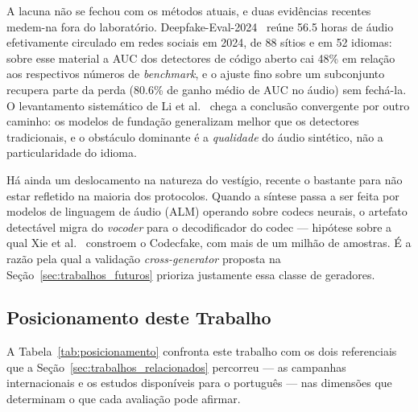 \documentclass[12pt,a4paper]{article}
\begin{document}
A lacuna não se fechou com os métodos atuais, e duas evidências recentes
medem-na fora do laboratório. Deepfake-Eval-2024~\cite{chandra2025deepfakeeval}
reúne \num{56,5} horas de áudio efetivamente circulado em redes sociais em
\num{2024}, de \num{88} sítios e em \num{52} idiomas: sobre esse material a
AUC dos detectores de código aberto cai \num{48}\% em relação aos respectivos
números de \textit{benchmark}, e o ajuste fino sobre um subconjunto recupera
parte da perda (\num{80,6}\% de ganho médio de AUC no áudio) sem fechá-la. O
levantamento sistemático de Li et al.~\cite{li2025sonar} chega a conclusão
convergente por outro caminho: os modelos de fundação generalizam melhor que os
detectores tradicionais, e o obstáculo dominante é a \emph{qualidade} do áudio
sintético, não a particularidade do idioma.

Há ainda um deslocamento na natureza do vestígio, recente o bastante para não
estar refletido na maioria dos protocolos. Quando a síntese passa a ser feita
por modelos de linguagem de áudio (ALM) operando sobre codecs neurais, o
artefato
detectável migra do \textit{vocoder} para o decodificador do codec ---
hipótese sobre a qual Xie et al.~\cite{xie2024codecfake} constroem o Codecfake,
com mais de um milhão de amostras. É a razão pela qual a validação
\textit{cross-generator} proposta na Seção~\ref{sec:trabalhos_futuros} prioriza
justamente essa classe de geradores.

\subsection{Posicionamento deste Trabalho}
\label{sec:posicionamento}

A Tabela~\ref{tab:posicionamento} confronta este trabalho com os dois
referenciais que a Seção~\ref{sec:trabalhos_relacionados} percorreu --- as
campanhas internacionais e os estudos disponíveis para o português --- nas
dimensões que determinam o que cada avaliação pode afirmar.
\end{document}
